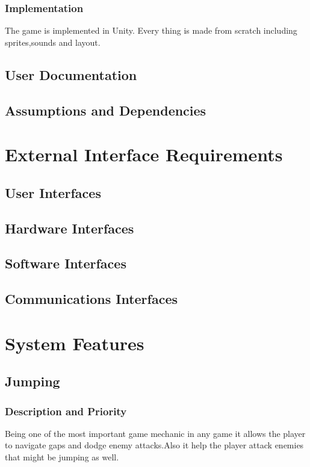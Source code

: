 \subsection{Implementation}
The game is implemented in Unity. Every thing is made from scratch including sprites,sounds and layout.
\section{User Documentation}

\section{Assumptions and Dependencies}

\newpage




\chapter{External Interface Requirements}
\label{External Interface Requirements}

\section{User Interfaces}
\section{Hardware Interfaces}
\section{Software Interfaces}
\section{Communications Interfaces}


\chapter{System Features}
\label{System Features}

\section{Jumping}
\subsection{Description and Priority}
Being one of the most important game mechanic in any game it allows the player to navigate gaps and dodge enemy attacks.Also it help the player attack enemies that might be jumping as well.
